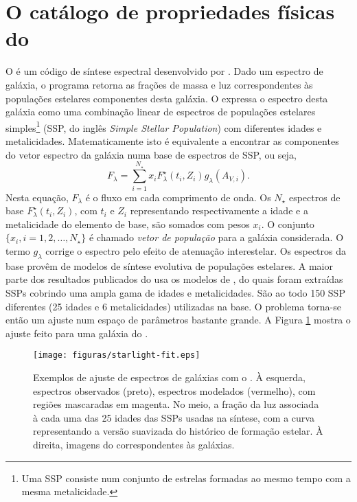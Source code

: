 
\section{O catálogo de propriedades físicas do \STARLIGHT}
\label{sec:Intro:Starlight}

O \starlight é um código de síntese espectral desenvolvido por
\citet{CidFernandes2005}. Dado um espectro de galáxia, o programa retorna as
frações de massa e luz correspondentes às populações estelares componentes desta
galáxia. O \starlight expressa o espectro desta galáxia como uma combinação
linear de espectros de populações estelares simples\footnote{Uma SSP consiste
num conjunto de estrelas formadas ao mesmo tempo com a mesma metalicidade.}
(SSP, do inglês {\em Simple Stellar Population}) com diferentes idades e
metalicidades. Matematicamente isto é equivalente a encontrar as componentes do
vetor espectro da galáxia numa base de espectros de SSP, ou seja,
\begin{equation*}
F_\lambda = \sum_{i=1}^{N_\star} x_i F^\star_\lambda(t_i,Z_i)
g_\lambda(A_{V,i}).
\end{equation*}
Nesta equação, $F_\lambda$ é o fluxo em cada comprimento de onda. Os $N_\star$
espectros de base $F^\star_\lambda(t_i, Z_i)$, com $t_i$ e $Z_i$ representando
respectivamente a idade e a metalicidade do elemento de base, são somados com
pesos $x_i$. O conjunto $\{x_i, i=1,2,\ldots,N_\star\}$ é chamado {\em vetor de
população} para a galáxia considerada. O termo $g_\lambda$ corrige o espectro
pelo efeito de atenuação interestelar. Os espectros da base provêm de modelos de
síntese evolutiva de populações estelares. A maior parte dos resultados
publicados do \starlight usa os modelos de \citet[BC03]{Bruzual2003}, do quais
foram extraídas SSPs cobrindo uma ampla gama de idades e metalicidades. São ao
todo 150 SSP diferentes (25 idades e 6 metalicidades) utilizadas na base. O
problema torna-se então um ajuste num espaço de parâmetros bastante grande. A
Figura \ref{fig:StarlightSpectrumSample} mostra o ajuste feito para uma galáxia
do \SDSS.

\begin{figure}
	\texttt{[image: figuras/starlight-fit.eps]}
	\caption[Exemplos de ajuste de espectro com o \starlight.]
	{Exemplos de ajuste de espectros de galáxias com o \starlight
	\citep{Asari2007}. À esquerda, espectros observados (preto), espectros
	modelados (vermelho), com regiões mascaradas em magenta. No meio, a fração da
	luz associada à cada uma das 25 idades das SSPs usadas na síntese, com a curva
	representando a versão suavizada do histórico de formação estelar. À direita,
	imagens do \SDSS correspondentes às galáxias.}
	\label{fig:StarlightSpectrumSample}
\end{figure}

